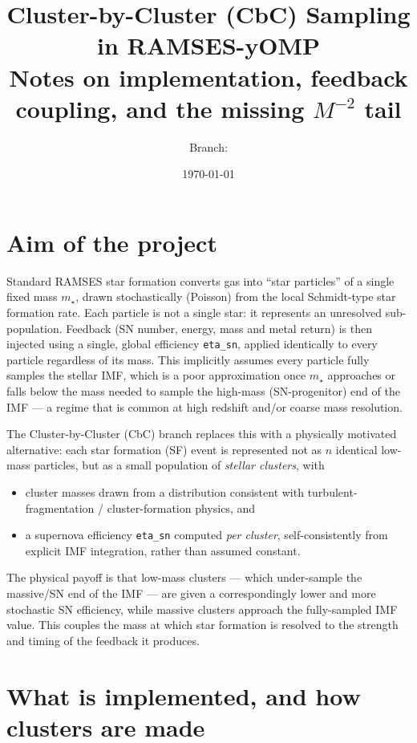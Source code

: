 \documentclass[11pt]{article}
\title{Cluster-by-Cluster (CbC) Sampling in RAMSES-yOMP\\
\large Notes on implementation, feedback coupling, and the missing $M^{-2}$ tail}
\author{Branch: \code{clusterBclusters}}
\date{\today}
\newcommand{\code}[1]{\texttt{#1}}
\begin{document}
\maketitle

\section{Aim of the project}

Standard RAMSES star formation converts gas into ``star particles'' of a
single fixed mass $m_\star$, drawn stochastically (Poisson) from the local
Schmidt-type star formation rate. Each particle is not a single star: it
represents an unresolved sub-population. Feedback (SN number, energy, mass
and metal return) is then injected using a single, global efficiency
\code{eta\_sn}, applied identically to every particle regardless of its
mass. This implicitly assumes every particle fully samples the stellar IMF,
which is a poor approximation once $m_\star$ approaches or falls below the
mass needed to sample the high-mass (SN-progenitor) end of the IMF --- a
regime that is common at high redshift and/or coarse mass resolution.

The Cluster-by-Cluster (CbC) branch replaces this with a physically
motivated alternative: each star formation (SF) event is represented not as
$n$ identical low-mass particles, but as a small population of
\emph{stellar clusters}, with

\begin{itemize}
  \item cluster masses drawn from a distribution consistent with
        turbulent-fragmentation / cluster-formation physics, and
  \item a supernova efficiency \code{eta\_sn} computed \emph{per cluster},
        self-consistently from explicit IMF integration, rather than
        assumed constant.
\end{itemize}

The physical payoff is that low-mass clusters --- which under-sample the
massive/SN end of the IMF --- are given a correspondingly lower and more
stochastic SN efficiency, while massive clusters approach the fully-sampled
IMF value. This couples the mass at which star formation is resolved to the
strength and timing of the feedback it produces.

\section{What is implemented, and how clusters are made}
\end{document}
